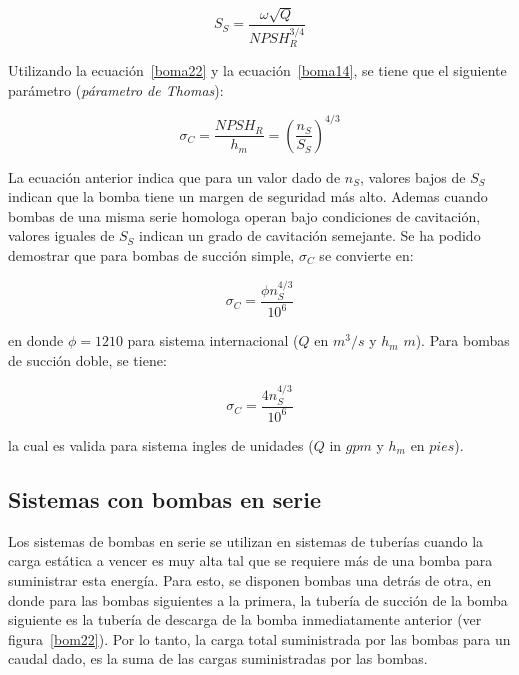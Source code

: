 \documentclass[11pt, oneside]{article}
\begin{document}
\begin{equation}
S_S = \frac{\omega \sqrt{Q}}{NPSH_R^{3/4}}
\label{boma22}
\end{equation}

Utilizando la ecuaci\'on~\ref{boma22} y la ecuaci\'on~\ref{boma14}, se tiene que el siguiente par\'ametro (\emph{p\'arametro de Thomas}):

\begin{equation}
\sigma_C = \frac{NPSH_R}{h_m} = \left(\frac{n_S}{S_S} \right)^{4/3}
\label{boma23}
\end{equation}

La ecuaci\'on anterior indica que para un valor dado de $n_S$, valores bajos de $S_S$ indican que la bomba tiene un margen de seguridad m\'as alto. Ademas cuando bombas de una misma serie homologa operan bajo condiciones de cavitaci\'on, valores iguales de $S_S$ indican un grado de cavitaci\'on  semejante. Se ha podido demostrar que para bombas de succi\'on simple, $\sigma_C$ se convierte en:

\begin{equation}
\sigma_C =  \frac{\phi n_S^{4/3}}{10^6} 
\label{boma24}
\end{equation}

en donde $\phi = 1210$ para sistema internacional ($Q$ en $m^3/s$ y $h_m$ $m$). Para bombas de succi\'on doble, se tiene:

\begin{equation}
\sigma_C =  \frac{4 n_S^{4/3}}{10^6} 
\label{boma25}
\end{equation}

la cual es valida para sistema ingles de unidades ($Q$ in $gpm$ y $h_m$ en $pies$).

\subsection{Sistemas con bombas en serie}
Los sistemas de bombas en serie se utilizan en sistemas de tuber\'ias cuando la carga est\'atica a vencer es muy alta tal que se requiere m\'as de una bomba para suministrar esta energ\'ia. Para esto, se disponen bombas una detr\'as de otra, en donde para las bombas siguientes a la primera, la tuber\'ia de succi\'on de la bomba siguiente es la tuber\'ia de descarga de la bomba inmediatamente anterior (ver figura~\ref{bom22}). Por lo tanto, la carga total suministrada por las bombas para un caudal dado, es la suma de las cargas suministradas por las bombas.
\end{document}
